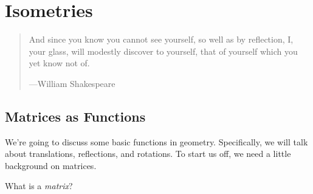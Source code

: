 \chapter{Isometries}

\begin{quote}
And since you know you cannot see yourself, so well as by reflection,
I, your glass, will modestly discover to yourself, that of yourself
which you yet know not of.

\hfill---William Shakespeare
\end{quote}




\section{Matrices as Functions}

We're going to discuss some basic functions in geometry.
Specifically, we will talk about translations, reflections, and
rotations. To start us off, we need a little background on
matrices.

\begin{ques} 
What is a \textit{matrix}?
\end{ques}

